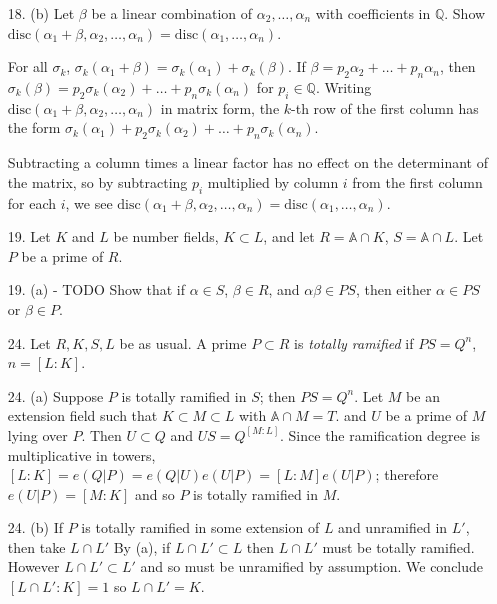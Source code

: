 \documentclass{article}
\newcommand{\Q}[0]{\mathbb{Q}}
\newcommand{\disc}[1]{\text{disc}(#1)}
\newcommand{\ringofintegers}[1]{\mathbb{A} \cap #1}
\begin{document}
\begin{enumerate}
\item[18. (b)] Let $\beta$ be a linear combination of $\alpha_2, \ldots, \alpha_n$ with coefficients in $\Q$.  Show $\disc{\alpha_1 + \beta, \alpha_2, \ldots, \alpha_n} = \disc{\alpha_1, \ldots, \alpha_n}$.

For all $\sigma_k$, $\sigma_k(\alpha_1 + \beta) = \sigma_k(\alpha_1) + \sigma_k(\beta)$.  If $\beta = p_2 \alpha_2 + \ldots + p_n \alpha_n$, then $\sigma_k(\beta) = p_2\sigma_k(\alpha_2) + \ldots + p_n\sigma_k(\alpha_n)$ for $p_i \in \Q$.  Writing $\disc{\alpha_1 + \beta, \alpha_2, \ldots, \alpha_n}$ in matrix form, the $k$-th row of the first column has the form $\sigma_k(\alpha_1) + p_2\sigma_k(\alpha_2) + \ldots + p_n\sigma_k(\alpha_n)$.

Subtracting a column times a linear factor has no effect on the determinant of the matrix, so by subtracting $p_i$ multiplied by column $i$ from the first column for each $i$, we see $\disc{\alpha_1 + \beta, \alpha_2, \ldots, \alpha_n} = \disc{\alpha_1, \ldots, \alpha_n}$.

\item[19.] Let $K$ and $L$ be number fields, $K \subset L$, and let $R = \ringofintegers{K}$, $S = \ringofintegers{L}$.  Let $P$ be a prime of $R$.

\item[19. (a) - TODO] Show that if $\alpha \in S$, $\beta \in R$, and $\alpha \beta \in PS$, then either $\alpha \in PS$ or $\beta \in P$.

\item[24.] Let $R, K, S, L$ be as usual.  A prime $P \subset R$ is {\it totally ramified} if $PS = Q^{n}$, $n = [L : K]$.

\item[24. (a)] Suppose $P$ is totally ramified in $S$; then $PS = Q^{n}$.  Let $M$ be an extension field such that $K \subset M \subset L$ with $\ringofintegers{M} = T$. and $U$ be a prime of $M$ lying over $P$.  Then $U \subset Q$ and $US = Q^{[M : L]}$.  Since the ramification degree is multiplicative in towers, $[L : K] = e(Q|P) = e(Q|U)e(U|P) = [L:M]e(U|P)$; therefore $e(U|P) = [M:K]$ and so $P$ is totally ramified in $M$.

\item[24. (b)] If $P$ is totally ramified in some extension of $L$ and unramified in $L'$, then take $L \cap L'$  By (a), if $L \cap L' \subset L$ then $L \cap L'$ must be totally ramified.  However $L \cap L' \subset L'$ and so must be unramified by assumption.  We conclude $[L \cap L' : K] = 1$ so $L \cap L' = K$.


\end{enumerate}
\end{document}
